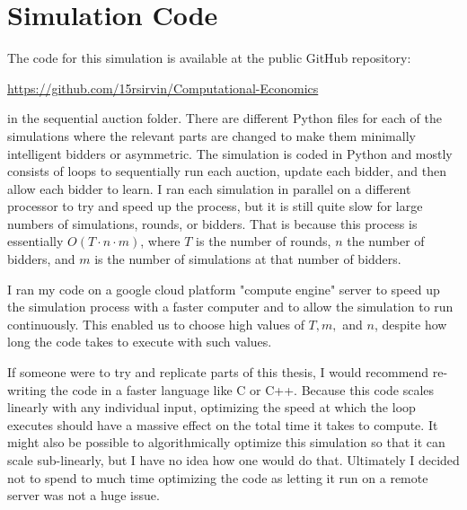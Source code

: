 \documentclass[12pt,twoside]{reedthesis}
\begin{document}
    \appendix
      \chapter{Simulation Code}
      The code for this simulation is available at the public GitHub repository:
      \begin{center}
      	\url{https://github.com/15rsirvin/Computational-Economics}
      \end{center}
      in the sequential auction folder. 
      There are different Python files for each of the simulations where the relevant parts are changed to make them minimally intelligent bidders or asymmetric. The simulation is coded in Python and mostly consists of loops to sequentially run each auction, update each bidder, and then allow each bidder to learn. I ran each simulation in parallel on a different processor to try and speed up the process, but it is still quite slow for large numbers of simulations, rounds, or bidders. That is because this process is essentially $O(T \cdot n \cdot m)$, where $T$ is the number of rounds, $n$ the number of bidders, and $m$ is the number of simulations at that number of bidders. 
      
      I ran my code on a google cloud platform "compute engine" server to speed up the simulation process with a faster computer and to allow the simulation to run continuously. This enabled us to choose high values of $T, m,$ and $n$, despite how long the code takes to execute with such values.  
      
      If someone were to try and replicate parts of this thesis, I would recommend re-writing the code in a faster language like C or C++. Because this code scales linearly with any individual input, optimizing the speed at which the loop executes should have a massive effect on the total time it takes to compute. It might also be possible to algorithmically optimize this simulation so that it can scale sub-linearly, but I have no idea how one would do that. Ultimately I decided not to spend to much time optimizing the code as letting it run on a remote server was not a huge issue.
      


  \backmatter %

    \nocite{*}
\end{document}

